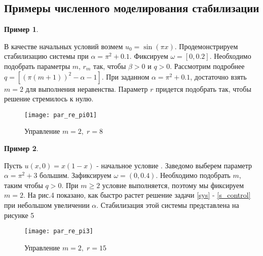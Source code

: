 \subsection{Примеры численного моделирования стабилизации}

\vspace{1em}

\newtheorem{exmp_st}{Пример}

\begin{exmp_st}
\end{exmp_st}

В качестве начальных условий возмем $u_0 = \sin(\pi x)$. Продемонстрируем 
стабилизацию системы при $\alpha = \pi^2 + 0.1$. Фиксируем $\omega = [0, 0.2]$. 
Необходимо подобрать параметры $m$, $r_m$ так, чтобы $\beta > 0$ и $q > 0$. 
Рассмотрим подробнее $q = [(\pi(m + 1))^2 - \alpha - 1]$. При заданном 
$\alpha = \pi^2 + 0.1$, достаточно взять $m = 2$ для выполнения неравенства. 
Параметр $r$ придется подобрать так, чтобы решение стремилось к нулю.


\begin{figure}[H]
    \centering
    \texttt{[image: par\_re\_pi01]}
    \caption{Управление $m = 2,\; r = 8$}
    \label{fig:test2}
\end{figure}

\begin{exmp_st}
\end{exmp_st}

Пусть $u(x, 0) = x(1 - x)$ - начальное условие . Заведомо выберем параметр 
$\alpha = \pi^2 + 3$ большим. Зафиксируем $\omega = (0, 0.4)$. 
Необходимо подобрать $m$, таким чтобы $q > 0$. При $m \ge 2$ условие выполняется, 
поэтому мы фиксируем $m = 2$. На рис.4 показано, как быстро растет решение 
задачи \eqref{sys} - \eqref{s_control} при небольшом увеличении $\alpha$. 
Стабилизация этой системы представлена на рисунке 5

\begin{figure}[H]
    \centering
    \texttt{[image: par\_re\_pi3]}
    \caption{Управление $m = 2,\; r = 15$}
    \label{fig:test2}
\end{figure}
